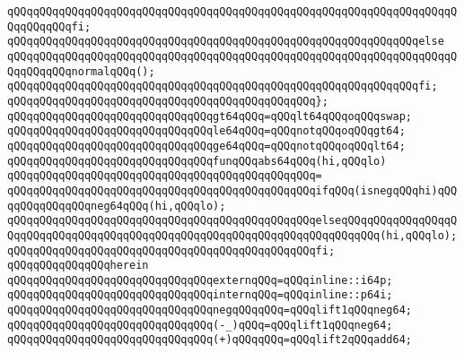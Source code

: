\verb|qQQqqQQqqQQqqQQqqQQqqQQqqQQqqQQqqQQqqQQqqQQqqQQqqQQqqQQqqQQqqQQqqQQqqQQqqQQqqQQqfi;|\newline
\verb|qQQqqQQqqQQqqQQqqQQqqQQqqQQqqQQqqQQqqQQqqQQqqQQqqQQqqQQqqQQqqQQqelse|\newline
\verb|qQQqqQQqqQQqqQQqqQQqqQQqqQQqqQQqqQQqqQQqqQQqqQQqqQQqqQQqqQQqqQQqqQQqqQQqqQQqqQQqnormalqQQq();|\newline
\verb|qQQqqQQqqQQqqQQqqQQqqQQqqQQqqQQqqQQqqQQqqQQqqQQqqQQqqQQqqQQqqQQqfi;|\newline
\verb|qQQqqQQqqQQqqQQqqQQqqQQqqQQqqQQqqQQqqQQqqQQqqQQq};|\newline
\newline
\verb|qQQqqQQqqQQqqQQqqQQqqQQqqQQqqQQqgt64qQQq=qQQqlt64qQQqoqQQqswap;|\newline
\verb|qQQqqQQqqQQqqQQqqQQqqQQqqQQqqQQqle64qQQq=qQQqnotqQQqoqQQqgt64;|\newline
\verb|qQQqqQQqqQQqqQQqqQQqqQQqqQQqqQQqge64qQQq=qQQqnotqQQqoqQQqlt64;|\newline
\newline
\verb|qQQqqQQqqQQqqQQqqQQqqQQqqQQqqQQqfunqQQqabs64qQQq(hi,qQQqlo)|\newline
\verb|qQQqqQQqqQQqqQQqqQQqqQQqqQQqqQQqqQQqqQQqqQQqqQQq=|\newline
\verb|qQQqqQQqqQQqqQQqqQQqqQQqqQQqqQQqqQQqqQQqqQQqqQQqifqQQq(isnegqQQqhi)qQQqqQQqqQQqqQQqneg64qQQq(hi,qQQqlo);|\newline
\verb|qQQqqQQqqQQqqQQqqQQqqQQqqQQqqQQqqQQqqQQqqQQqqQQqelseqQQqqQQqqQQqqQQqqQQqqQQqqQQqqQQqqQQqqQQqqQQqqQQqqQQqqQQqqQQqqQQqqQQqqQQqqQQq(hi,qQQqlo);|\newline
\verb|qQQqqQQqqQQqqQQqqQQqqQQqqQQqqQQqqQQqqQQqqQQqqQQqfi;|\newline
\newline
\verb|qQQqqQQqqQQqqQQqherein|\newline
\newline
\verb|qQQqqQQqqQQqqQQqqQQqqQQqqQQqqQQqexternqQQq=qQQqinline::i64p;|\newline
\verb|qQQqqQQqqQQqqQQqqQQqqQQqqQQqqQQqinternqQQq=qQQqinline::p64i;|\newline
\newline
\verb|qQQqqQQqqQQqqQQqqQQqqQQqqQQqqQQqnegqQQqqQQq=qQQqlift1qQQqneg64;|\newline
\newline
\verb|qQQqqQQqqQQqqQQqqQQqqQQqqQQqqQQq(-_)qQQq=qQQqlift1qQQqneg64;|\newline
\verb|qQQqqQQqqQQqqQQqqQQqqQQqqQQqqQQq(+)qQQqqQQq=qQQqlift2qQQqadd64;|\newline
